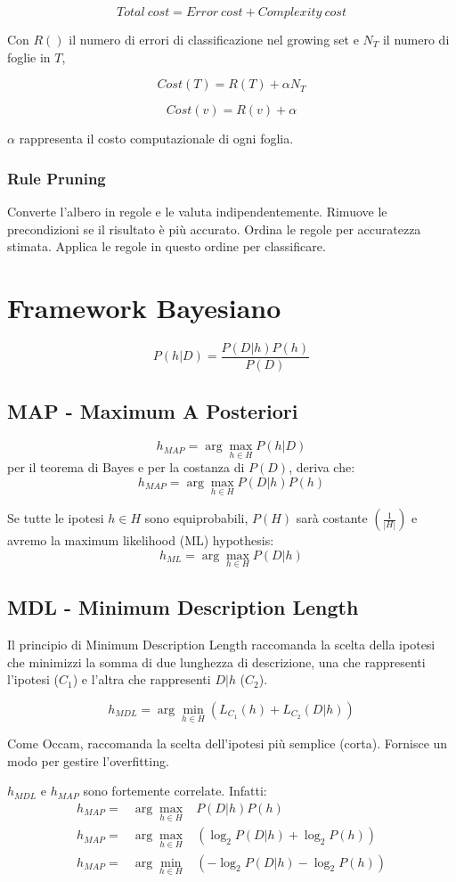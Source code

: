 \documentclass[11pt,onecolumn,a4paper,oneside]{book}
\begin{document}
$$Total~cost = Error~cost + Complexity~cost$$

Con $R()$ il numero di errori di classificazione nel growing set e $N_T$ il numero di foglie in $T$,

$$Cost(T) = R(T) + \alpha N_T$$

$$Cost(v) = R(v) + \alpha $$

$\alpha$ rappresenta il costo computazionale di ogni foglia.

\subsection{Rule Pruning}
Converte l'albero in regole e le valuta indipendentemente.
Rimuove le precondizioni se il risultato è più accurato.
Ordina le regole per accuratezza stimata. Applica le regole in questo ordine per classificare.


\chapter{Framework Bayesiano}

$$P(h|D)=\frac{P(D|h)P(h)}{P(D)}$$


\section{MAP - Maximum A Posteriori}
$$h_{MAP} = \arg\max_{h \in H} P(h|D)$$
per il teorema di Bayes e per la costanza di $P(D)$, deriva che:
$$h_{MAP} = \arg\max_{h \in H} P(D|h)P(h)$$

Se tutte le ipotesi $h \in H$ sono equiprobabili, $P(H)$ sarà costante $\left( \frac{1}{|H|} \right)$ e avremo la maximum likelihood (ML) hypothesis:
$$h_{ML} = \arg\max_{h\in H} P(D|h)$$


\section{MDL - Minimum Description Length}
Il principio di Minimum Description Length raccomanda la scelta della ipotesi che minimizzi la somma di due lunghezza di descrizione, una che rappresenti l'ipotesi ($C_1$) e l'altra che rappresenti $D|h$ ($C_2$).

$$h_{MDL} = \arg\min_{h\in H} \left(L_{C_{1}}(h) + L_{C_{2}}(D|h)\right)$$

Come Occam, raccomanda la scelta dell'ipotesi più semplice (corta).
Fornisce un modo per gestire l'overfitting.

$h_{MDL}$ e $h_{MAP}$ sono fortemente correlate.
Infatti:
\begin{eqnarray*}
h_{MAP} = & \arg\max\limits_{h \in H} & P(D|h)P(h) \\
h_{MAP} = & \arg\max\limits_{h \in H} & \left( \log_{2} P(D|h) + \log_{2} P(h) \right) \\
h_{MAP} = & \arg\min\limits_{h \in H} & \left( - \log_{2} P(D|h) - \log_{2} P(h) \right) \\
\end{eqnarray*}
\end{document}
